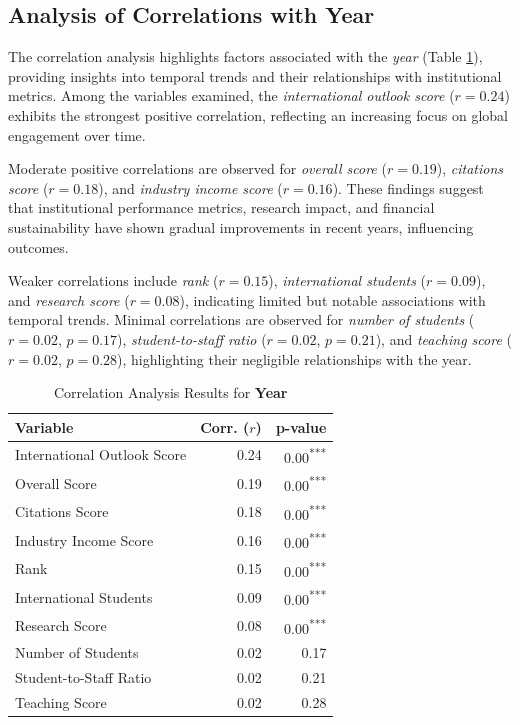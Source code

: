 \documentclass[conference]{IEEEtran}
\begin{document}
\subsection{Analysis of Correlations with Year}

The correlation analysis highlights factors associated with the \textit{year} (Table \ref{tab:correlation_year}), providing insights into temporal trends and their relationships with institutional metrics. Among the variables examined, the \textit{international outlook score} ($r = 0.24$) exhibits the strongest positive correlation, reflecting an increasing focus on global engagement over time.

Moderate positive correlations are observed for \textit{overall score} ($r = 0.19$), \textit{citations score} ($r = 0.18$), and \textit{industry income score} ($r = 0.16$). These findings suggest that institutional performance metrics, research impact, and financial sustainability have shown gradual improvements in recent years, influencing outcomes.

Weaker correlations include \textit{rank} ($r = 0.15$), \textit{international students} ($r = 0.09$), and \textit{research score} ($r = 0.08$), indicating limited but notable associations with temporal trends. Minimal correlations are observed for \textit{number of students} ($r = 0.02$, $p = 0.17$), \textit{student-to-staff ratio} ($r = 0.02$, $p = 0.21$), and \textit{teaching score} ($r = 0.02$, $p = 0.28$), highlighting their negligible relationships with the year.

\begin{table}[h!]
	\centering
	\caption{Correlation Analysis Results for \textbf{Year}}
	\label{tab:correlation_year}
	\begin{tabular}{|l|r|r|}
		\hline
		\textbf{Variable} & \textbf{Corr. ($r$)} & \textbf{p-value} \\
		\hline
		International Outlook Score & 0.24 & 0.00\textsuperscript{***} \\
		Overall Score & 0.19 & 0.00\textsuperscript{***} \\
		Citations Score & 0.18 & 0.00\textsuperscript{***} \\
		Industry Income Score & 0.16 & 0.00\textsuperscript{***} \\
		Rank & 0.15 & 0.00\textsuperscript{***} \\
		International Students & 0.09 & 0.00\textsuperscript{***} \\
		Research Score & 0.08 & 0.00\textsuperscript{***} \\
		Number of Students & 0.02 & 0.17 \\
		Student-to-Staff Ratio & 0.02 & 0.21 \\
		Teaching Score & 0.02 & 0.28 \\
		\hline
	\end{tabular}
\end{table}
\end{document}
